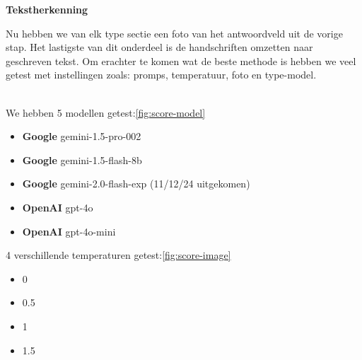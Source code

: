 \documentclass[12pt]{article}
\begin{document}
\noindent
\textbf{Tekstherkenning}
\begin{multicols}{2}
Nu hebben we van elk type sectie een foto van het antwoordveld uit de vorige stap. Het lastigste van dit onderdeel is de handschriften omzetten naar geschreven tekst. Om erachter te komen wat de beste methode is hebben we veel getest met instellingen zoals: promps, temperatuur, foto en type-model.\\
\\
\begin{minipage}{\textwidth}
We hebben 5 modellen getest:\ref{fig:score-model}
\begin{itemize}
    \item \textbf{Google} gemini-1.5-pro-002
    \item \textbf{Google} gemini-1.5-flash-8b
    \item \textbf{Google} gemini-2.0-flash-exp \newline (11/12/24 uitgekomen)
    \item \textbf{OpenAI} gpt-4o
    \item \textbf{OpenAI} gpt-4o-mini
\end{itemize}
\end{minipage}

\noindent\begin{minipage}{\textwidth}
4 verschillende temperaturen getest:\ref{fig:score-image}
\begin{itemize}
    \item 0
    \item 0.5
    \item 1
    \item 1.5
\end{itemize}
\end{minipage}
\end{multicols}
\pagebreak
\end{document}
